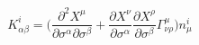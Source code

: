 \begin{equation}
K^i_{\alpha\beta}=\bigl(\frac{\partial^2
X^\mu}{\partial\sigma^\alpha\partial\sigma^\beta}+\frac{\partial
X^\nu}{\partial\sigma^\alpha}\frac{\partial
X^\rho}{\partial\sigma^\beta}\Gamma^\mu_{\nu\rho}\bigr)n^i_\mu
\end{equation}

